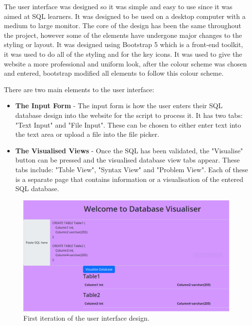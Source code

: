 The user interface was designed so it was simple and easy to use since it was aimed at SQL learners. It was designed to be used on a desktop computer with a medium to large monitor. The core of the design has been the same throughout the project, however some of the elements have undergone major changes to the styling or layout. It was designed using Bootstrap 5 \cite{Bootstrap} which is a front-end toolkit, it was used to do all of the styling and for the key icons. It was used to give the website a more professional and uniform look, after the colour scheme was chosen and entered, bootstrap modified all elements to follow this colour scheme.

There are two main elements to the user interface: 

\begin{itemize}
	\item \textbf{The Input Form} - The input form is how the user enters their SQL database design into the website for the script to process it. It has two tabs: "Text Input" and "File Input". These can be chosen to either enter text into the text area or upload a file into the file picker.
	\item \textbf{The Visualised Views} - Once the SQL has been validated, the "Visualise" button can be pressed and the visualised database view tabs appear. These tabs include: "Table View", "Syntax View" and "Problem View". Each of these is a separate page that contains information or a visualisation of the entered SQL database.
\end{itemize}

\begin{figure}[h!]
	\centering
	\includegraphics[width=\textwidth]{firstDesign}
	\caption{First iteration of the user interface design.}
	\label{fig:firstDesign}
\end{figure}

